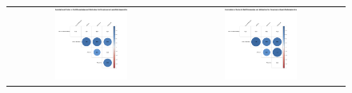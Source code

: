 \begin{figure}[htb]
\begin{tabular}{cc}
 \includegraphics[width=0.45\textwidth]{images/chap-evaluation/corr-signedup-second/non-gamifiedApprentice1.png}&
 \includegraphics[width=0.45\textwidth]{images/chap-evaluation/corr-signedup-second/ont-gamifiedApprentice1.png}
 \end{tabular}
 \fautor
\end{figure}


